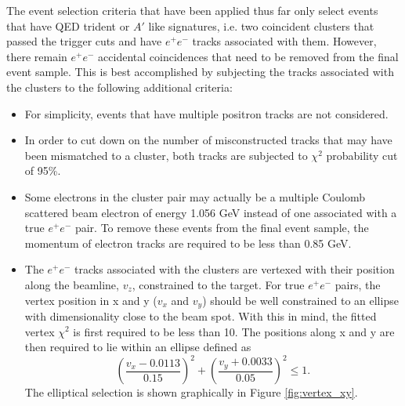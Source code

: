 The event selection criteria that have been applied thus far only select 
events that have QED trident or $A'$ like signatures, i.e. two coincident clusters that
passed the trigger cuts and have $e^+e^-$ tracks associated with them.  However, 
there remain $e^+e^-$ accidental coincidences that need to be removed from the final 
event sample.  This is best accomplished by subjecting the tracks associated 
with the clusters to the following additional criteria:
\begin{itemize}
    \item For simplicity, events that have multiple positron tracks are not 
          considered.
    \item In order to cut down on the number of misconstructed tracks that may
          have been mismatched to a cluster, both tracks are subjected to 
          $\chi^2$ probability cut of 95\%.
    \item Some electrons in the cluster pair may actually be a multiple
          Coulomb scattered beam electron of energy 1.056 GeV 
          instead of one associated with a true $e^+e^-$ 
          pair.  To remove these events from the final event sample, the 
          momentum of electron tracks are required to be less than 0.85 GeV.
    \item The $e^+e^-$ tracks associated with the clusters are vertexed with 
          their position along the beamline, $v_z$, constrained to the target. 
          For true $e^+e^-$ pairs, the vertex position in x and y ($v_x$ and $v_y$) should be
          well constrained to an ellipse with dimensionality close to the beam 
          spot.  With this in mind, the fitted vertex $\chi^2$ is first required 
          to be less than 10.  The positions along x and y are then required 
          to lie within an ellipse 
          defined as
          \[
          \left (\frac{v_x - 0.0113}{0.15} \right)^2 + \left(\frac{v_y + 0.0033}{0.05} \right)^2  \le 1.
          \]
          The elliptical selection is shown graphically in Figure \ref{fig:vertex_xy}.
\end{itemize}

